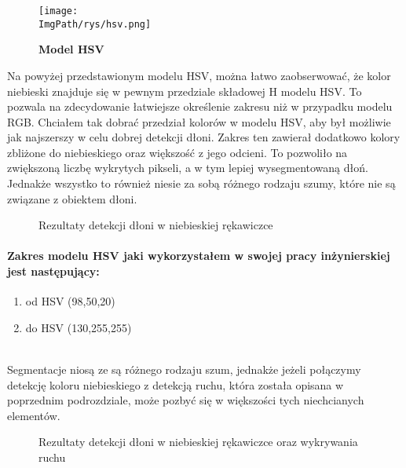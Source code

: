 \documentclass[a4paper,12pt,twoside,openany]{report}
\newcommand{\ImgPath}{.}
\begin{document}
\begin{figure}[H]	
	\centering
	\texttt{[image: \\ImgPath/rys/hsv.png]}
	
	\caption{  \textbf{Model HSV}}
\end{figure}

Na powyżej przedstawionym modelu HSV, można łatwo zaobserwować, że kolor niebieski znajduje się w pewnym przedziale składowej H modelu HSV. To pozwala na zdecydowanie łatwiejsze określenie zakresu niż w przypadku modelu RGB. 
Chciałem tak dobrać przedział kolorów w modelu HSV, aby był możliwie jak najszerszy w celu dobrej detekcji dłoni. Zakres ten zawierał dodatkowo kolory zbliżone do niebieskiego oraz większość z jego odcieni. To pozwoliło na zwiększoną liczbę wykrytych pikseli, a w tym lepiej wysegmentowaną dłoń. Jednakże wszystko to również niesie za sobą różnego rodzaju szumy, które nie są związane z obiektem dłoni. 
\begin{figure}[H]
	\centering
	\caption{Rezultaty detekcji dłoni w niebieskiej rękawiczce}
\end{figure}

\paragraph{Zakres modelu HSV jaki wykorzystałem w swojej pracy inżynierskiej jest następujący:}
\begin{enumerate}
	\item od HSV (98,50,20)
	\item do HSV (130,255,255)
\end{enumerate}
\mbox{} \\

Segmentacje niosą ze są różnego rodzaju szum, jednakże jeżeli połączymy detekcję koloru niebieskiego z detekcją ruchu, która została opisana w poprzednim podrozdziale, może pozbyć się w większości tych niechcianych elementów. 

\begin{figure}[H]
	\centering
	\caption{Rezultaty detekcji dłoni w niebieskiej rękawiczce oraz wykrywania ruchu}
\end{figure}
\end{document}
